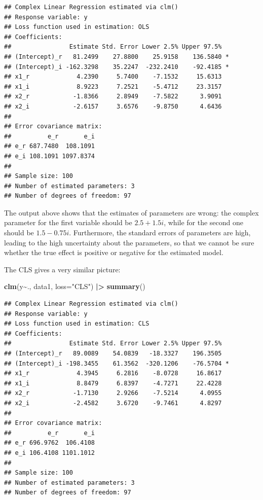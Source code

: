 \documentclass[
]{book}
\newenvironment{Shaded}{\begin{snugshade}}{\end{snugshade}}
\newcommand{\DataTypeTok}[1]{\textcolor[rgb]{0.13,0.29,0.53}{#1}}
\newcommand{\ErrorTok}[1]{\textcolor[rgb]{0.64,0.00,0.00}{\textbf{#1}}}
\newcommand{\KeywordTok}[1]{\textcolor[rgb]{0.13,0.29,0.53}{\textbf{#1}}}
\newcommand{\NormalTok}[1]{#1}
\newcommand{\OperatorTok}[1]{\textcolor[rgb]{0.81,0.36,0.00}{\textbf{#1}}}
\newcommand{\StringTok}[1]{\textcolor[rgb]{0.31,0.60,0.02}{#1}}
\begin{document}
\begin{verbatim}
## Complex Linear Regression estimated via clm()
## Response variable: y
## Loss function used in estimation: OLS
## Coefficients:
##                Estimate Std. Error Lower 2.5% Upper 97.5%  
## (Intercept)_r   81.2499    27.8800    25.9158    136.5840 *
## (Intercept)_i -162.3298    35.2247  -232.2410    -92.4185 *
## x1_r             4.2390     5.7400    -7.1532     15.6313  
## x1_i             8.9223     7.2521    -5.4712     23.3157  
## x2_r            -1.8366     2.8949    -7.5822      3.9091  
## x2_i            -2.6157     3.6576    -9.8750      4.6436  
## 
## Error covariance matrix:
##          e_r       e_i
## e_r 687.7480  108.1091
## e_i 108.1091 1097.8374
## 
## Sample size: 100
## Number of estimated parameters: 3
## Number of degrees of freedom: 97
\end{verbatim}

The output above shows that the estimates of parameters are wrong: the complex parameter for the first variable should be \(2.5 + 1.5i\), while for the second one should be \(1.5 - 0.75i\). Furthermore, the standard errors of parameters are high, leading to the high uncertainty about the parameters, so that we cannot be sure whether the true effect is positive or negative for the estimated model.

The CLS gives a very similar picture:

\begin{Shaded}
\begin{Highlighting}[]
\KeywordTok{clm}\NormalTok{(y}\OperatorTok{\textasciitilde{}}\NormalTok{., data1, }\DataTypeTok{loss=}\StringTok{"CLS"}\NormalTok{) }\OperatorTok{|}\ErrorTok{\textgreater{}}
\StringTok{    }\KeywordTok{summary}\NormalTok{()}
\end{Highlighting}
\end{Shaded}

\begin{verbatim}
## Complex Linear Regression estimated via clm()
## Response variable: y
## Loss function used in estimation: CLS
## Coefficients:
##                Estimate Std. Error Lower 2.5% Upper 97.5%  
## (Intercept)_r   89.0089    54.0839   -18.3327    196.3505  
## (Intercept)_i -198.3455    61.3562  -320.1206    -76.5704 *
## x1_r             4.3945     6.2816    -8.0728     16.8617  
## x1_i             8.8479     6.8397    -4.7271     22.4228  
## x2_r            -1.7130     2.9266    -7.5214      4.0955  
## x2_i            -2.4582     3.6720    -9.7461      4.8297  
## 
## Error covariance matrix:
##          e_r       e_i
## e_r 696.9762  106.4108
## e_i 106.4108 1101.1012
## 
## Sample size: 100
## Number of estimated parameters: 3
## Number of degrees of freedom: 97
\end{verbatim}
\end{document}
